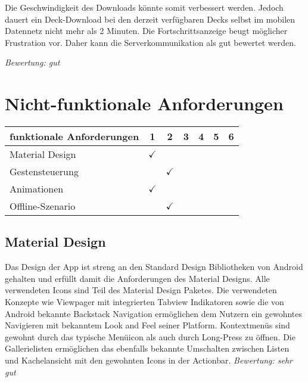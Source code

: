 Die Geschwindigkeit des Downloads könnte somit verbessert werden. Jedoch dauert ein Deck-Download bei den derzeit verfügbaren Decks selbst im mobilen Datennetz nicht mehr als 2 Minuten. Die Fortschrittsanzeige beugt möglicher Frustration vor. Daher kann die Serverkommunikation als gut bewertet werden.

\vspace{5mm}
\emph{Bewertung: gut}
\vspace{5mm}

\section{Nicht-funktionale Anforderungen}
\label{sec:abgleich_nichtfunktionaleanforderungen}

\begin{table}[ht]
\centering
\begin{tabular}{l|c c c c c c}
funktionale Anforderungen & 1 & 2 & 3 & 4 & 5 & 6 \\ \hline\hline
Material Design & $\checkmark$ &  &  &  &  &   \\
Gestensteuerung &  & $\checkmark$  &  &  &  & \\
Animationen & $\checkmark$ &  &  &  &  & \\
Offline-Szenario & & $\checkmark$  &  &  &  &
\end{tabular}
\label{tab:abgleich_nichtfunktionaleanforderungen}
\end{table}

\subsection{Material Design}

Das Design der App ist streng an den Standard Design Bibliotheken von Android gehalten und erfüllt damit die Anforderungen des Material Designs. Alle verwendeten Icons sind Teil des Material Design Paketes. Die verwendeten Konzepte wie Viewpager mit integrierten 
Tabview Indikatoren sowie die von Android bekannte Backstack Navigation ermöglichen dem Nutzern ein gewohntes Navigieren mit bekanntem Look and Feel seiner Platform. Kontextmenüs sind gewohnt durch das typische Menüicon als auch durch Long-Press zu öffnen. Die Gallerielisten ermöglichen das ebenfalls bekannte Umschalten zwischen Listen und Kachelansicht mit den gewohnten Icons in der Actionbar.
\vspace{5mm}
\emph{Bewertung: sehr gut}
\vspace{5mm}

